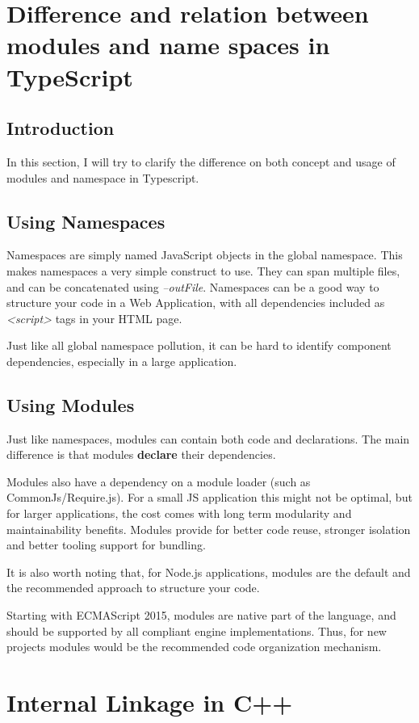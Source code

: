 \documentclass[a4paper]{report}
\begin{document}
\section{Difference and relation between modules and name spaces in TypeScript}
\subsection{Introduction}
In this section, I will try to  clarify the difference on both concept and usage of modules and namespace in Typescript.
\subsection{Using Namespaces}
Namespaces are simply named JavaScript objects in the global namespace. This makes namespaces a very simple construct to use. They can span multiple files, and can be concatenated using \emph{--outFile}. Namespaces can be a good way to structure your code in a Web Application, with all dependencies included as \emph{<script>} tags in your HTML page.
\par
Just like all global namespace pollution, it can be hard to identify component dependencies, especially in a large application.
\subsection{Using Modules}
Just like namespaces, modules can contain both code and declarations. The main difference is that modules \textbf{declare} their dependencies.
\par
Modules also have a dependency on a module loader (such as CommonJs/Require.js). For a small JS application this might not be optimal, but for larger applications, the cost comes with long term modularity and maintainability benefits. Modules provide for better code reuse, stronger isolation and better tooling support for bundling.
\par
It is also worth noting that, for Node.js applications, modules are the default and the recommended approach to structure your code.
\par
Starting with ECMAScript 2015, modules are native part of the language, and should be supported by all compliant engine implementations. Thus, for new projects modules would be the recommended code organization mechanism.
\section{Internal Linkage in C++}
\end{document}
